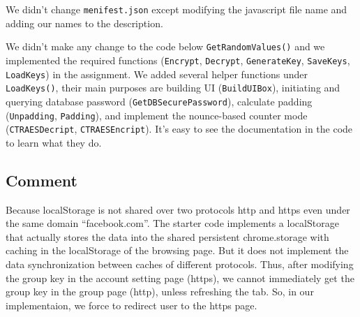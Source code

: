 We didn't change \texttt{menifest.json} except modifying the javascript file name and adding our names to the description.

We didn't make any change to the code below \texttt{GetRandomValues()} and we implemented the required functions (\texttt{Encrypt}, \texttt{Decrypt}, \texttt{GenerateKey}, \texttt{SaveKeys}, \texttt{LoadKeys}) in the assignment. We added several helper functions under \texttt{LoadKeys()}, their main purposes are building UI (\texttt{BuildUIBox}), initiating and querying database password (\texttt{GetDBSecurePassword}), calculate padding (\texttt{Unpadding}, \texttt{Padding}), and implement the nounce-based counter mode (\texttt{CTRAESDecript}, \texttt{CTRAESEncript}). It's easy to see the documentation in the code to learn what they do.

\subsection{Comment}

Because localStorage is not shared over two protocols http and https even under the same domain ``facebook.com''. 
The starter code implements a localStorage that actually stores the data into the shared persistent chrome.storage with caching in the localStorage of the browsing page. But it does not implement the data synchronization between caches of different protocols. Thus, after modifying the group key in the account setting page (https), we cannot immediately get the group key in the group page (http), unless refreshing the tab. So, in our implementaion, we force to redirect user to the https page. 



